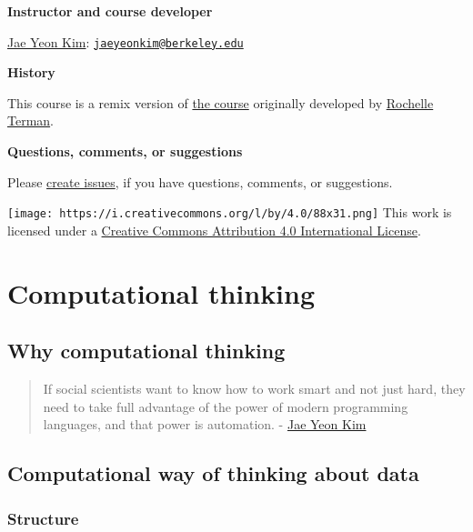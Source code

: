 \documentclass[
]{book}
\begin{document}
\textbf{Instructor and course developer}

\href{https://jaeyk.github.io/}{Jae Yeon Kim}: \href{mailto:jaeyeonkim@berkeley.edu}{\nolinkurl{jaeyeonkim@berkeley.edu}}

\textbf{History}

This course is a remix version of \href{https://github.com/rochelleterman/PS239T}{the course} originally developed by \href{https://github.com/rochelleterman}{Rochelle Terman}.

\textbf{Questions, comments, or suggestions}

Please \href{https://github.com/jaeyk/PS239T/issues}{create issues}, if you have questions, comments, or suggestions.

\texttt{[image: https://i.creativecommons.org/l/by/4.0/88x31.png]} This work is licensed under a \href{https://creativecommons.org/licenses/by/4.0/}{Creative Commons Attribution 4.0 International License}.

\hypertarget{Motivation}{%
\chapter{Computational thinking}\label{Motivation}}

\hypertarget{why-computational-thinking}{%
\section{Why computational thinking}\label{why-computational-thinking}}

\begin{quote}
If social scientists want to know how to work smart and not just hard, they need to take full advantage of the power of modern programming languages, and that power is automation. - \href{https://dlab.berkeley.edu/blog/why-teaching-social-scientists-how-code-professional-important}{Jae Yeon Kim}
\end{quote}

\hypertarget{computational-way-of-thinking-about-data}{%
\section{Computational way of thinking about data}\label{computational-way-of-thinking-about-data}}

\hypertarget{structure}{%
\subsection{Structure}\label{structure}}
\end{document}
